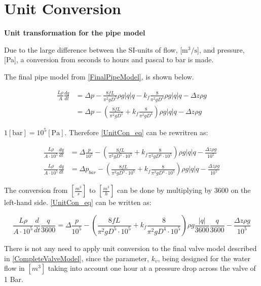 \chapter{Unit Conversion}
\label{unitCON}
\textbf{Unit transformation for the pipe model}

Due to the large difference between the SI-units of flow, [$\text{m}^3/\text{s}$], and pressure, [Pa], a conversion from seconds to hours and pascal to bar is made.

The final pipe model from \eqref{FinalPipeModel}, is shown below.   

\begin{equation}
\begin{split}
   \frac{L \rho}{A} \frac{dq}{dt} &=\Delta p - \frac{8fL}{\pi^{2}gD^5} \rho g  |q| q - k_f \frac{8}{\pi^2gD^4} \rho g |q| q - \Delta z \rho g \\
   &=\Delta p - (\frac{8fL}{\pi^{2}gD^5} + k_f \frac{8}{\pi^2gD^4}) \rho g |q| q - \Delta z \rho g
\end{split}
\label{UnitCon_eq}
\end{equation}

$1 [\text{bar}] = 10^5[\text{Pa}]$. Therefore \eqref{UnitCon_eq} can be rewritren as: 

\begin{equation}
\begin{split}
   \frac{L \rho}{A\cdot10^5} \frac{dq}{dt} &= \Delta \frac{p}{10^5} - (\frac{8fL}{\pi^{2}gD^5\cdot10^5} + k_f \frac{8}{\pi^2gD^4\cdot10^5}) \rho g |q| q - \frac{\Delta z \rho g}{10^5}\\
   \frac{L \rho}{A\cdot10^5} \frac{dq}{dt} &= \Delta p_{bar} - (\frac{8fL}{\pi^{2}gD^5\cdot10^5} + k_f \frac{8}{\pi^2gD^4\cdot10^5}) \rho g |q| q - \frac{\Delta z \rho g}{10^5}
\end{split}
\end{equation}

The conversion from $[\frac{m^3}{s}]$ to $[\frac{m^3}{h}]$ can be done by multiplying by 3600 on the left-hand side. \eqref{UnitCon_eq} can be written as:

\begin{equation}
   \frac{L \rho}{A\cdot10^5} \frac{d}{dt}\frac{q}{3600} = \Delta \frac{p}{10^5} - (\frac{8fL}{\pi^{2}gD^5\cdot10^5} + k_f \frac{8}{\pi^2gD^4\cdot10^5}) \rho g \frac{|q|}{3600} \frac{q}{3600} - \frac{\Delta z \rho g}{10^5}
\end{equation}

There is not any need to apply unit conversion to the final valve model described in \eqref{CompleteValveModel}, since the parameter, $k_v$, being designed for the water flow in $[m^3]$ taking into account one hour at a pressure drop across the valve of 1 Bar. 

